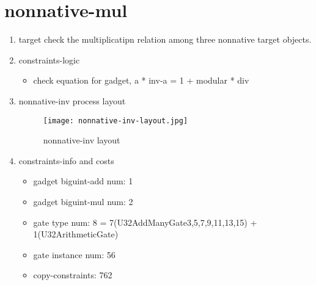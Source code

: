 \section{nonnative-mul}
\label{nonnative-mul}

\begin{enumerate}
    \item target
        check the multiplicatipn relation among three nonnative target objects.
    \item constraints-logic
        \begin{itemize}
            \item check equation for gadget,  a * inv-a = 1 + modular * div
        \end{itemize}
    \item nonnative-inv process layout
        \begin{figure}[!ht]
            \centering
            \texttt{[image: nonnative-inv-layout.jpg]}
            \caption{nonnative-inv layout}
            \label{fig:nonnative-inv-layout}
        \end{figure}
    
    \item constraints-info and costs
        \begin{itemize}
            \item gadget biguint-add num: 1
            \item gadget biguint-mul num: 2
            \item gate type num: 8 = 7(U32AddManyGate{3,5,7,9,11,13,15}) + 1(U32ArithmeticGate)
            \item gate instance num: 56
            \item copy-constraints: 762
        \end{itemize}

\end{enumerate}